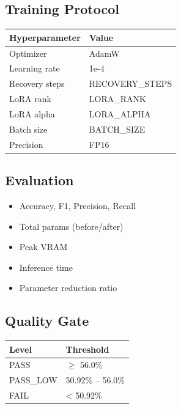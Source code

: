 \subsection{Training Protocol}

\begin{table}[H]
\centering
\small
\begin{tabular}{ll}
\toprule
\textbf{Hyperparameter} & \textbf{Value} \\
\midrule
Optimizer & AdamW \\
Learning rate & 1e-4 \\
Recovery steps & {{RECOVERY\_STEPS}} \\
LoRA rank & {{LORA\_RANK}} \\
LoRA alpha & {{LORA\_ALPHA}} \\
Batch size & {{BATCH\_SIZE}} \\
Precision & FP16 \\
\bottomrule
\end{tabular}
\end{table}

\subsection{Evaluation}

\begin{itemize}
\item Accuracy, F1, Precision, Recall
\item Total params (before/after)
\item Peak VRAM
\item Inference time
\item Parameter reduction ratio

\end{itemize}
\subsection{Quality Gate}

\begin{table}[H]
\centering
\small
\begin{tabular}{ll}
\toprule
\textbf{Level} & \textbf{Threshold} \\
\midrule
PASS & $\ge$ 56.0\% \\
PASS\_LOW & 50.92\% -- 56.0\% \\
FAIL & < 50.92\% \\
\bottomrule
\end{tabular}
\end{table}

